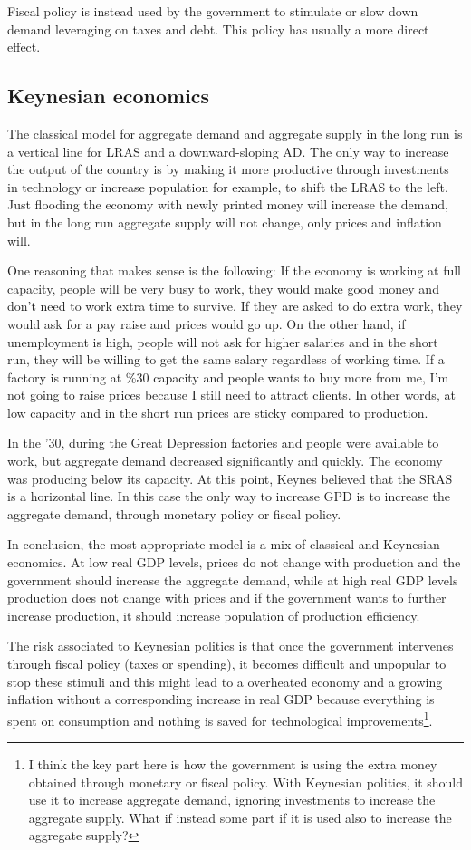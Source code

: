 Fiscal policy is instead used by the government to stimulate or slow down demand leveraging on taxes and debt. This policy has usually a more direct effect.

\subsection{Keynesian economics}
The classical model for aggregate demand and aggregate supply in the long run is a vertical line for LRAS and a downward-sloping AD. The only way to increase the output of the country is by making it more productive through investments in technology or increase population for example, to shift the LRAS to the left. Just flooding the economy with newly printed money will increase the demand, but in the long run aggregate supply will not change, only prices and inflation will.

One reasoning that makes sense is the following: If the economy is working at full capacity, people will be very busy to work, they would make good money and don't need to work extra time to survive. If they are asked to do extra work, they would ask for a pay raise and prices would go up. On the other hand, if unemployment is high, people will not ask for higher salaries and in the short run, they will be willing to get the same salary regardless of working time. If a factory is running at \%30 capacity and people wants to buy more from me, I'm not going to raise prices because I still need to attract clients. In other words, at low capacity and in the short run prices are sticky compared to production.

In the '30, during the Great Depression factories and people were available to work, but aggregate demand decreased significantly and quickly. The economy was producing below its capacity. At this point, Keynes believed that the SRAS is a horizontal line. In this case the only way to increase GPD is to increase the aggregate demand, through monetary policy or fiscal policy.

In conclusion, the most appropriate model is a mix of classical and Keynesian economics. At low real GDP levels, prices do not change with production and the government should increase the aggregate demand, while at high real GDP levels production does not change with prices and if the government wants to further increase production, it should increase population of production efficiency.

The risk associated to Keynesian politics is that once the government intervenes through fiscal policy (taxes or spending), it becomes difficult and unpopular to stop these stimuli and this might lead to a overheated economy and a growing inflation without a corresponding increase in real GDP because everything is spent on consumption and nothing is saved for technological improvements\footnote{I think the key part here is how the government is using the extra money obtained through monetary or fiscal policy. With Keynesian politics, it should use it to increase aggregate demand, ignoring investments to increase the aggregate supply. What if instead some part if it is used also to increase the aggregate supply?}.

